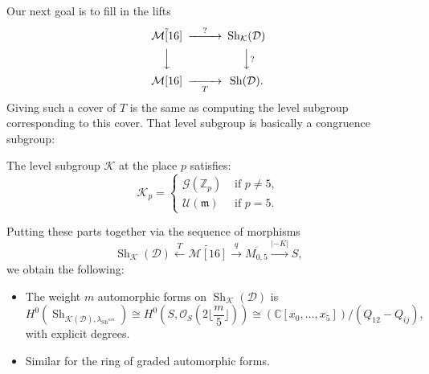 \documentclass[reqno]{amsart} 
\begin{document}
Our next goal is to fill in the lifts
\begin{equation*}
  \begin{CD}
    \tilde{\mathcal{M}[16]}  @>?>> \operatorname{Sh}_{\mathcal{K}}(\mathcal{D})\\
    @VVV  @VV?V \\
    \mathcal{M}[16] @>>T> \operatorname{Sh}(\mathcal{D}).\\
  \end{CD}
\end{equation*}
Giving such a cover of $T$ is the same as computing the level subgroup corresponding to this cover.  That level subgroup is basically a congruence subgroup:

\begin{proposition}
  The level subgroup $\mathcal{K}$ at the place $p$ satisfies:
  \begin{equation*}
    \mathcal{K}_p =
    \begin{cases}
      \mathcal{G}(\mathbb{Z}_p)      & \text{ if } p \neq 5, \\
      \mathcal{U}(\mathfrak{m})                                     & \text{ if } p = 5.
    \end{cases}
  \end{equation*}
\end{proposition}

Putting these parts together via the sequence of morphisms
\begin{equation*}
  \operatorname{Sh}_{\mathcal{K}}(\mathcal{D}) \xleftarrow{T} \tilde{\mathcal{M}[16]}
  \xrightarrow{q} \overline{M_{0, 5}}
  \xrightarrow{\lvert - K \rvert} S,
\end{equation*}
we obtain the following:
\begin{proposition}
  \begin{itemize}
  \item The weight $m$ automorphic forms on $\operatorname{Sh}_{\mathcal{K}}(\mathcal{D})$ is
    \begin{equation*}
      H^0(\operatorname{Sh}_{\mathcal{K}(\mathcal{D}), \lambda_{\mathrm{Sh}^{\otimes m}}})
      \cong H^0(S, \mathcal{O}_S(2 \lfloor \frac{m}{5} \rfloor))
      \cong \left( \mathbb{C}[x_0, \dotsc, x_5] \right) / (Q_{12} - Q_{i j}),
    \end{equation*}
    with explicit degrees.
  \item Similar for the ring of graded automorphic forms.
  \end{itemize}
\end{proposition}
\end{document}
